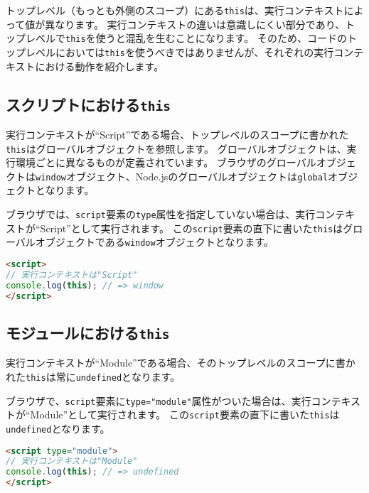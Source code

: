 トップレベル（もっとも外側のスコープ）にある\texttt{this}は、実行コンテキストによって値が異なります。
実行コンテキストの違いは意識しにくい部分であり、トップレベルで\texttt{this}を使うと混乱を生むことになります。
そのため、コードのトップレベルにおいては\texttt{this}を使うべきではありませんが、それぞれの実行コンテキストにおける動作を紹介します。

\hypertarget{script-this}{%
\subsection{\texorpdfstring{スクリプトにおける\texttt{this}}{スクリプトにおけるthis}}\label{script-this}}

実行コンテキストが``Script''である場合、トップレベルのスコープに書かれた\texttt{this}はグローバルオブジェクトを参照します。
グローバルオブジェクトは、実行環境ごとに異なるものが定義されています。
ブラウザのグローバルオブジェクトは\texttt{window}オブジェクト、Node.jsのグローバルオブジェクトは\texttt{global}オブジェクトとなります。

ブラウザでは、\texttt{script}要素の\texttt{type}属性を指定していない場合は、実行コンテキストが``Script''として実行されます。
この\texttt{script}要素の直下に書いた\texttt{this}はグローバルオブジェクトである\texttt{window}オブジェクトとなります。

\begin{lstlisting}[language=HTML]
<script>
// 実行コンテキストは"Script"
console.log(this); // => window
</script>
\end{lstlisting}

\hypertarget{module-this}{%
\subsection{\texorpdfstring{モジュールにおける\texttt{this}}{モジュールにおけるthis}}\label{module-this}}

実行コンテキストが``Module''である場合、そのトップレベルのスコープに書かれた\texttt{this}は常に\texttt{undefined}となります。

ブラウザで、\texttt{script}要素に\texttt{type="module"}属性がついた場合は、実行コンテキストが``Module''として実行されます。
この\texttt{script}要素の直下に書いた\texttt{this}は\texttt{undefined}となります。

\begin{lstlisting}[language=HTML]
<script type="module">
// 実行コンテキストは"Module"
console.log(this); // => undefined
</script>
\end{lstlisting}

